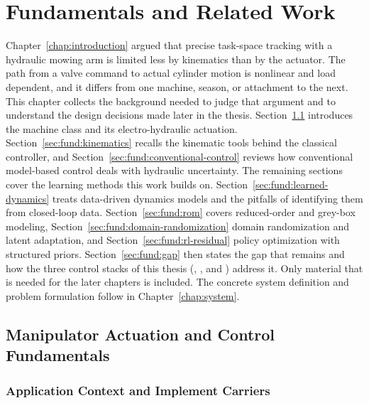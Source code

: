 \chapter{Fundamentals and Related Work}
\label{chap:fundamentals}

Chapter~\ref{chap:introduction} argued that precise task-space tracking
with a hydraulic mowing arm is limited less by kinematics than by the
actuator. The path from a valve command to actual cylinder motion is
nonlinear and load dependent, and it differs from one machine, season, or
attachment to the next. This chapter collects the background needed to
judge that argument and to understand the design decisions made later in
the thesis. Section~\ref{sec:fund:actuation} introduces the machine class
and its electro-hydraulic actuation. Section~\ref{sec:fund:kinematics}
recalls the kinematic tools behind the classical controller, and
Section~\ref{sec:fund:conventional-control} reviews how conventional
model-based control deals with hydraulic uncertainty. The remaining sections cover the learning methods this work builds on.
Section~\ref{sec:fund:learned-dynamics} treats data-driven dynamics models and
the pitfalls of identifying them from closed-loop data.
Section~\ref{sec:fund:rom} covers reduced-order and grey-box modeling,
Section~\ref{sec:fund:domain-randomization} domain randomization and latent
adaptation, and Section~\ref{sec:fund:rl-residual} policy optimization with
structured priors.
Section~\ref{sec:fund:gap} then states the gap that remains and how the
three control stacks of this thesis (\ppoROM, \ppoIDFD, and
\ppoIDAAMFD) address it. Only material that is
needed for the later chapters is included. The concrete system definition
and problem formulation follow in Chapter~\ref{chap:system}.

\section{Manipulator Actuation and Control Fundamentals}
\label{sec:fund:actuation}

\subsection{Application Context and Implement Carriers}

